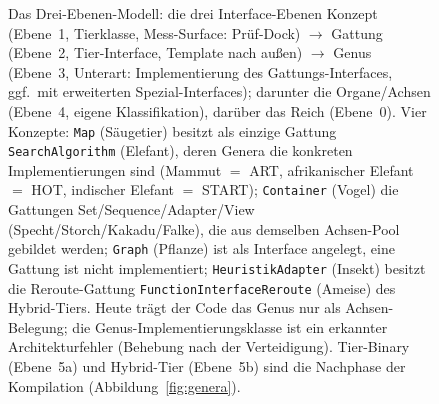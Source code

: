 \begin{nurlang}
\begin{figure}[htbp]
\caption{Das Drei-Ebenen-Modell: die drei Interface-Ebenen Konzept (Ebene~1, Tierklasse, Mess-Surface: Prüf-Dock) $\to$ Gattung (Ebene~2, Tier-Interface, Template nach außen) $\to$ Genus (Ebene~3, Unterart: Implementierung des Gattungs-Interfaces, ggf.\ mit erweiterten Spezial-Interfaces); darunter die Organe/Achsen (Ebene~4, eigene Klassifikation), darüber das Reich (Ebene~0). Vier Konzepte: \texttt{Map} (Säugetier) besitzt als einzige Gattung \texttt{SearchAlgorithm} (Elefant), deren Genera die konkreten Implementierungen sind (Mammut $=$ ART, afrikanischer Elefant $=$ HOT, indischer Elefant $=$ START); \texttt{Container} (Vogel) die Gattungen Set/Sequence/Adapter/View (Specht/Storch/Kakadu/Falke), die aus demselben Achsen-Pool gebildet werden; \texttt{Graph} (Pflanze) ist als Interface angelegt, eine Gattung ist nicht implementiert; \texttt{HeuristikAdapter} (Insekt) besitzt die Reroute-Gattung \texttt{FunctionInterfaceReroute} (Ameise) des Hybrid-Tiers. Heute trägt der Code das Genus nur als Achsen-Belegung; die Genus-Implementierungsklasse ist ein erkannter Architekturfehler (Behebung nach der Verteidigung). Tier-Binary (Ebene~5a) und Hybrid-Tier (Ebene~5b) sind die Nachphase der Kompilation (Abbildung~\ref{fig:genera}).}\label{fig:three-levels}

\end{figure}
\end{nurlang}
